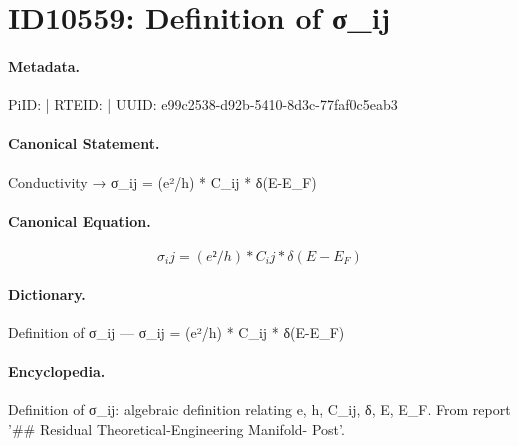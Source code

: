 \section*{ID10559: Definition of σ\_ij}
\paragraph{Metadata.}
PiID:  | RTEID:  | UUID: e99c2538-d92b-5410-8d3c-77faf0c5eab3

\paragraph{Canonical Statement.}
Conductivity → σ\_ij = (e²/h) * C\_ij * δ(E-E\_F)

\paragraph{Canonical Equation.}
\[
σ_ij = (e²/h) * C_ij * δ(E-E_F)
\]

\paragraph{Dictionary.}
Definition of σ\_ij — σ\_ij = (e²/h) * C\_ij * δ(E-E\_F)

\paragraph{Encyclopedia.}
Definition of σ\_ij: algebraic definition relating e, h, C\_ij, δ, E, E\_F. From report '\#\# Residual Theoretical-Engineering Manifold- Post'.
